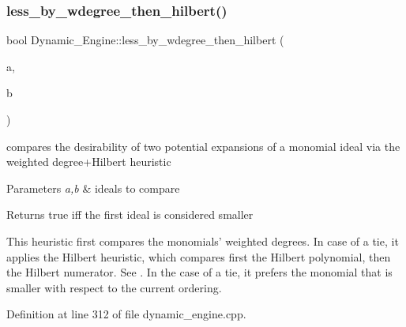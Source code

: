 \subsubsection{\texorpdfstring{less\+\_\+by\+\_\+wdegree\+\_\+then\+\_\+hilbert()}{less\_by\_wdegree\_then\_hilbert()}}
{\footnotesize\ttfamily bool Dynamic\+\_\+\+Engine\+::less\+\_\+by\+\_\+wdegree\+\_\+then\+\_\+hilbert (\begin{DoxyParamCaption}\item[{\hyperlink{group___g_b_computation_class_dynamic___engine_1_1_p_p___with___ideal}{P\+P\+\_\+\+With\+\_\+\+Ideal} \&}]{a,  }\item[{\hyperlink{group___g_b_computation_class_dynamic___engine_1_1_p_p___with___ideal}{P\+P\+\_\+\+With\+\_\+\+Ideal} \&}]{b }\end{DoxyParamCaption})}



compares the desirability of two potential expansions of a monomial ideal via the weighted degree+\+Hilbert heuristic 


\begin{DoxyParams}{Parameters}
{\em a,b} & ideals to compare \\
\hline
\end{DoxyParams}
\begin{DoxyReturn}{Returns}
{\ttfamily true} iff the first ideal is considered smaller
\end{DoxyReturn}
This heuristic first compares the monomials' weighted degrees. In case of a tie, it applies the Hilbert heuristic, which compares first the Hilbert polynomial, then the Hilbert numerator. See \cite{CaboaraDynAlg}. In the case of a tie, it prefers the monomial that is smaller with respect to the current ordering. 

Definition at line 312 of file dynamic\+\_\+engine.\+cpp.

